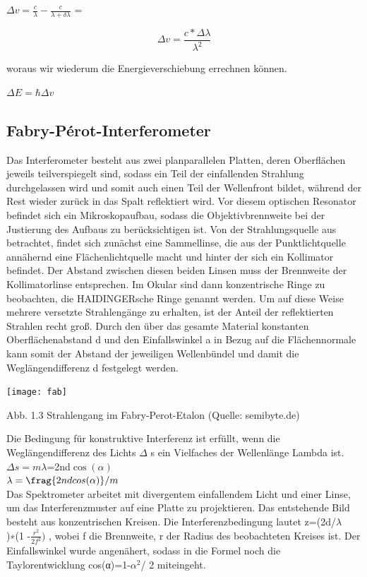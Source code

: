 \documentclass[10pt,a4paper]{article}
\begin{document}
$\Delta v=\frac{c}{\lambda}  -\frac{c}{\lambda+\delta\lambda}$ =


\begin{equation}
\Delta v = \frac {c*\Delta \lambda} {\lambda^2}
 \label{1f}
\end{equation}


woraus wir wiederum die Energieverschiebung errechnen können. 

$\Delta E=\hbar \Delta v$

\subsection{ Fabry-Pérot-Interferometer} 

Das Interferometer besteht aus zwei planparallelen Platten, deren Oberflächen jeweils teilverspiegelt sind, sodass ein Teil der einfallenden Strahlung durchgelassen wird und somit auch einen Teil der Wellenfront bildet, während der Rest wieder zurück in das Spalt reflektiert wird. Vor diesem optischen Resonator befindet sich ein Mikroskopaufbau, sodass die Objektivbrennweite bei der Justierung des Aufbaus zu berücksichtigen ist. Von der Strahlungsquelle aus betrachtet, findet sich zunächst eine Sammellinse, die aus der Punktlichtquelle annähernd eine Flächenlichtquelle macht und hinter der sich ein Kollimator befindet. Der Abstand zwischen diesen beiden Linsen muss der Brennweite der Kollimatorlinse entsprechen. Im Okular sind dann konzentrische Ringe zu beobachten, die HAIDINGERsche Ringe genannt werden. Um auf diese Weise mehrere versetzte Strahlengänge zu erhalten, ist der Anteil der reflektierten Strahlen recht groß. Durch den über das gesamte Material konstanten Oberflächenabstand d und den Einfallswinkel a in Bezug auf die Flächennormale kann somit der Abstand der jeweiligen Wellenbündel und damit die Weglängendifferenz d festgelegt werden.


\texttt{[image: fab]}

Abb. 1.3 Strahlengang im Fabry-Perot-Etalon (Quelle: semibyte.de)


Die Bedingung für konstruktive Interferenz ist erfüllt, wenn die Weglängendifferenz des Lichts $\Delta$ s ein Vielfaches der Wellenlänge Lambda ist.\\

$\Delta s=m\lambda$=2nd$\cos(\alpha)$\\

$\lambda= \frag{2ndcos(\alpha)}/ {m} $\\

Das Spektrometer arbeitet mit divergentem einfallendem Licht und einer Linse, um das Interferenzmuster auf eine Platte zu projektieren. Das entstehende Bild besteht aus konzentrischen Kreisen. 
Die Interferenzbedingung lautet z=(2d/$\lambda$ )∗(1 -$\frac{r^2} {2f^2} )$ , wobei f die Brennweite, r der Radius des beobachteten Kreises ist. Der Einfallswinkel wurde angenähert, sodass in die Formel noch die Taylorentwicklung cos(α)=1-$\alpha^2$/ 2 miteingeht.
\end{document}
